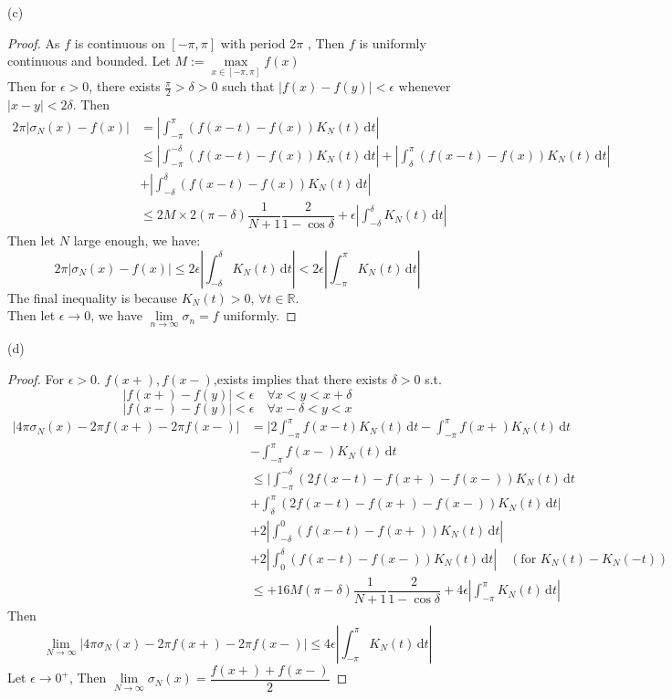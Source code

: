 \documentclass{article}
\begin{document}
(c)\begin{proof}
    As  $ f  $ is continuous on  $ [-\pi,\pi ] $ with period  $ 2\pi $ , Then  $ f $ is uniformly continuous and bounded. Let  $ M:=\max\limits_{x\in[-\pi,\pi]}f(x) $ \\
    Then for  $ \epsilon>0  $, there exists  $ \frac{\pi }{2}>\delta>0  $ such that  $ |f(x)-f(y)|<\epsilon $ whenever  $ |x-y|<2\delta $.
    Then 
    \begin{align*}
        2\pi|\sigma_N(x)-f(x)|&=|\int_{-\pi }^{\pi} (f(x-t)-f(x))K_N(t)\, \mathrm{d}t|\\
         &\leqslant |\int_{-\pi }^{-\delta} (f(x-t)-f(x))K_N(t)\, \mathrm{d}t|+|\int_{\delta}^{\pi } (f(x-t)-f(x))K_N(t)\, \mathrm{d}t|\\&+|\int_{-\delta}^{\delta} (f(x-t)-f(x))K_N(t)\, \mathrm{d}t|\\
         & \leqslant 2M\times2(\pi-\delta)\dfrac{1}{N+1}\dfrac{2}{1-\cos{\delta}}+\epsilon|\int_{-\delta}^{\delta} K_N(t)\, \mathrm{d}t|  
    \end{align*}  
    Then let  $ N  $ large enough, we have:
    \[2\pi|\sigma_N(x)-f(x)| \leqslant 2\epsilon|\int_{-\delta}^{\delta} K_N(t)\, \mathrm{d}t|<2\epsilon|\int_{-\pi}^{\pi} K_N(t)\, \mathrm{d}t|    \]
    The final inequality is because  $ K_N(t)>0, \,\forall t\in \mathbb{R} $.\\
    Then let  $ \epsilon\rightarrow0  $, we have  $ \lim\limits_{n\to\infty} \sigma_n=f  $ uniformly.  
\end{proof}
(d)
\begin{proof}
    For  $ \epsilon>0 $. 
 $ f(x+),f(x-) $,exists implies that there exists  $ \delta>0 $ s.t. 
 \[|f(x+)-f(y)|<\epsilon\quad \forall x<y<x+\delta\]
 \[|f(x-)-f(y)|<\epsilon\quad \forall x-\delta<y<x\]
    \begin{align*}
        |4\pi\sigma_N(x)-2\pi f(x+)-2\pi f(x-)|&=  |2\int_{-\pi}^{\pi} f(x-t)K_N(t)\, \mathrm{d}t-\int_{-\pi}^{\pi} f(x+)K_N(t)\, \mathrm{d}t\\&-\int_{-\pi}^{\pi}f(x-) K_N(t)\, \mathrm{d}t  \\
        & \leqslant |\int_{-\pi }^{-\delta}(2f(x-t)-f(x+)-f(x-))K_N(t) \, \mathrm{d}t\\&+\int_{\delta}^{\pi} (2f(x-t)-f(x+)-f(x-))K_N(t)\, \mathrm{d}t|\\
        &+2|\int_{-\delta}^{0}(f(x-t)-f(x+)) K_N(t)\, \mathrm{d}t|\\&+2|\int_{0}^{\delta} (f(x-t)-f(x-))K_N(t)\, \mathrm{d}t|\quad(\text{for } K_N(t)-K_N(-t))\\
        & \leqslant+16M(\pi-\delta)\dfrac{1}{N+1}\dfrac{2}{1-\cos{\delta}}+4\epsilon|\int_{-\pi}^{\pi} K_N(t)\, \mathrm{d}t|
    \end{align*}
    Then\[\lim\limits_{N\to\infty}|4\pi\sigma_N(x)-2\pi f(x+)-2\pi f(x-)| \leqslant 4\epsilon|\int_{-\pi}^{\pi} K_N(t)\, \mathrm{d}t|    \] 
    Let  $ \epsilon\rightarrow0^+ $, Then  $ \lim\limits_{N\to\infty}\sigma_N(x)=\dfrac{f(x+)+f(x-)}{2}   $

\end{proof}
\end{document}
